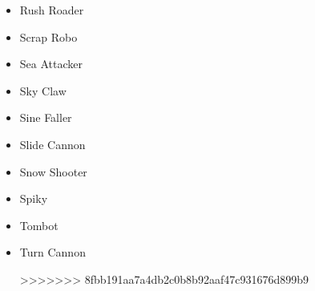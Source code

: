 \begin{itemize}
	\item \hypertarget{enem:Rush_Roader}{Rush Roader}
	\item \hypertarget{enem:Scrap_Robo}{Scrap Robo}
	\item \hypertarget{enem:Sea_Attacker}{Sea Attacker}
	\item \hypertarget{enem:Sky_Claw}{Sky Claw}
	\item \hypertarget{enem:Sine_Faller}{Sine Faller}
	\item \hypertarget{enem:Slide_Cannon}{Slide Cannon}
	\item \hypertarget{enem:Snow_Shooter}{Snow Shooter}
	\item \hypertarget{enem:Spiky}{Spiky}
	\item \hypertarget{enem:Tombot}{Tombot}
	\item \hypertarget{enem:Turn_Cannon}{Turn Cannon}
	








>>>>>>> 8fbb191aa7a4db2c0b8b92aaf47c931676d899b9
\end{itemize}









